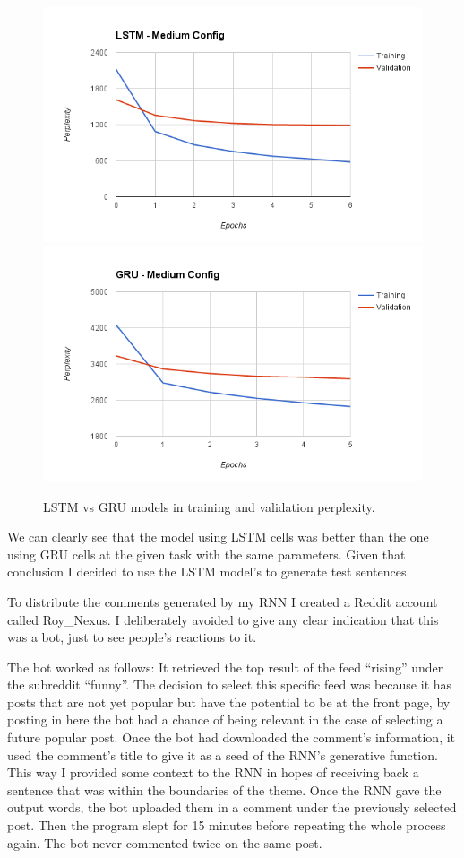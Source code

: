 \documentclass{article} %
\begin{document}
\begin{figure}[h]
\centering
\includegraphics[scale=0.5]{lstm_medium_config}
\includegraphics[scale=0.5]{gru_medium_config}
\caption{LSTM vs GRU models in training and validation perplexity.}
\label{fig:perplexity}
\end{figure}

We can clearly see that the model using LSTM cells was better than the one using
GRU cells at the given task with the same parameters. Given that conclusion I
decided to use the LSTM model's to generate test sentences.

To distribute the comments generated by my RNN I created a Reddit account called
Roy\_Nexus. I deliberately avoided to give any clear indication that this was
a bot, just to see people's reactions to it.

The bot worked as follows: It retrieved the top result of the feed ``rising''
under the subreddit ``funny''.  The decision to select this specific feed was
because it has posts that are not yet popular but have the potential to be at
the front page, by posting in here the bot had a chance of being relevant in the
case of selecting a future popular post. Once the bot had downloaded the
comment's information, it used the comment's title to give it as a seed of the
RNN's generative function. This way I provided some context to the RNN in hopes
of receiving back a sentence that was within the boundaries of the theme. Once
the RNN gave the output words, the bot uploaded them in a comment under the
previously selected post. Then the program slept for 15 minutes before repeating
the whole process again. The bot never commented twice on the same post.
\end{document}
